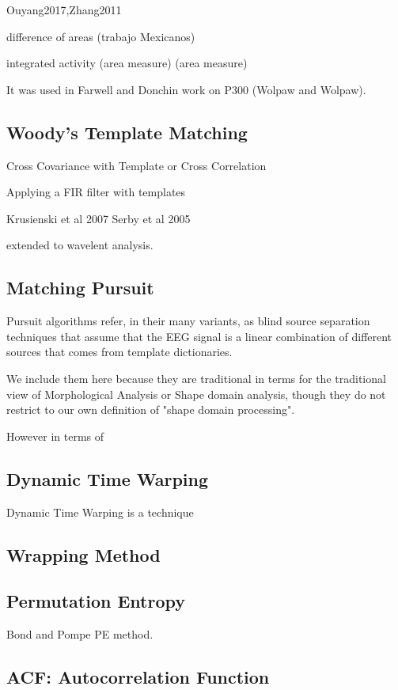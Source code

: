 \documentclass[sensors,article,submit,moreauthors,pdftex,10pt,a4paper]{mdpi}
\begin{document}
Ouyang2017,Zhang2011

difference of areas (trabajo Mexicanos)

 integrated activity (area measure) (area measure)
 
 It was used in Farwell and Donchin work on P300 (Wolpaw and Wolpaw).

\subsection{Woody's Template Matching}

Cross Covariance with Template or Cross Correlation

Applying a FIR filter with templates 

Krusienski et al 2007
Serby et al 2005

extended to wavelent analysis.

\subsection{Matching Pursuit}

Pursuit algorithms refer, in their many variants, as blind source separation techniques that assume that the EEG signal is a linear combination of different sources that comes from template dictionaries.

We include them here because they are traditional in terms for the traditional view of Morphological Analysis or Shape domain analysis, though they do not restrict to our own definition of "shape domain processing".

However in terms of 

\subsection{Dynamic Time Warping}

Dynamic Time Warping is a technique 

\subsection{Wrapping Method}

\subsection{Permutation Entropy}

Bond and Pompe PE method.

\subsection{ACF: Autocorrelation Function}
\end{document}
